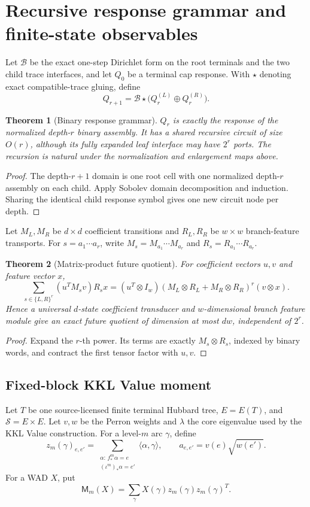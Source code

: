 \documentclass[11pt]{article}
\newtheorem{theorem}{Theorem}[section]
\theoremstyle{definition}
\theoremstyle{remark}
\begin{document}
\section{Recursive response grammar and finite-state observables}
Let $\mathcal B$ be the exact one-step Dirichlet form on the root terminals and
the two child trace interfaces, and let $Q_0$ be a terminal cap response.  With
$\star$ denoting exact compatible-trace gluing, define
\[
 Q_{r+1}=\mathcal B\star\bigl(Q_r^{(L)}\oplus Q_r^{(R)}\bigr).
\]

\begin{theorem}[Binary response grammar]
$Q_r$ is exactly the response of the normalized depth-$r$ binary assembly.
It has a shared recursive circuit of size $O(r)$, although its fully expanded
leaf interface may have $2^r$ ports.  The recursion is natural under the
normalization and enlargement maps above.
\end{theorem}

\begin{proof}
The depth-$r+1$ domain is one root cell with one normalized depth-$r$ assembly
on each child.  Apply Sobolev domain decomposition and induction.  Sharing the
identical child response symbol gives one new circuit node per depth.
\end{proof}

Let $M_L,M_R$ be $d\times d$ coefficient transitions and $R_L,R_R$ be
$w\times w$ branch-feature transports.  For $s=a_1\cdots a_r$, write
$M_s=M_{a_1}\cdots M_{a_r}$ and $R_s=R_{a_1}\cdots R_{a_r}$.

\begin{theorem}[Matrix-product future quotient]
For coefficient vectors $u,v$ and feature vector $x$,
\[
 \sum_{s\in\{L,R\}^r}(u^TM_sv)R_sx
 = (u^T\otimes I_w)
   (M_L\otimes R_L+M_R\otimes R_R)^r
   (v\otimes x).
\]
Hence a universal $d$-state coefficient transducer and $w$-dimensional branch
feature module give an exact future quotient of dimension at most $dw$,
independent of $2^r$.
\end{theorem}

\begin{proof}
Expand the $r$-th power.  Its terms are exactly $M_s\otimes R_s$, indexed by
binary words, and contract the first tensor factor with $u,v$.
\end{proof}

\subsection*{Fixed-block KKL Value moment}
Let $T$ be one source-licensed finite terminal Hubbard tree, $E=E(T)$, and
$\mathcal S=E\times E$.  Let $v,w$ be the Perron weights and $\lambda$ the core
eigenvalue used by the KKL Value construction.  For a level-$m$ arc $\gamma$,
define
\[
 z_m(\gamma)_{e,e'}=
 \sum_{\substack{\alpha:\,f_*^m\alpha=e\\
                 (\iota^m)_*\alpha=e'}}
 \langle\alpha,\gamma\rangle,
 \qquad
 a_{e,e'}=v(e)\sqrt{w(e')}.
\]
For a WAD $X$, put
\[
 \mathsf M_m(X)=\sum_\gamma X(\gamma)
 z_m(\gamma)z_m(\gamma)^T.
\]
\end{document}
